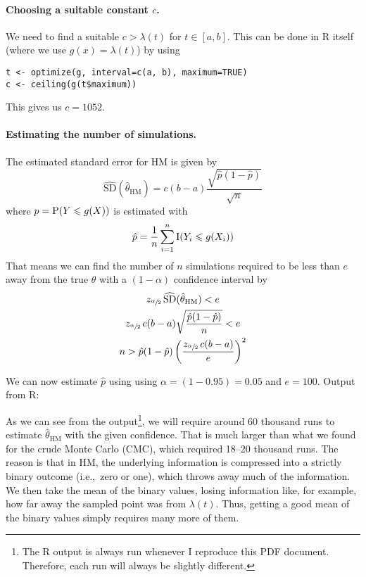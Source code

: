 \documentclass[a4paper,english,12pt]{article}
\begin{document}
\paragraph{Choosing a suitable constant $c$.}
We need to find a suitable $c > \lambda(t)$ for $t \in [a, b]$. This can be
done in R itself (where we use $g(x) = \lambda(t)$) by using
\begin{Verbatim}
t <- optimize(g, interval=c(a, b), maximum=TRUE)
c <- ceiling(g(t$maximum))
\end{Verbatim}
This gives us $c = 1052$.

\paragraph{Estimating the number of simulations.}
The estimated standard error for HM is given by
\[
  \widehat{\textrm{SD}}(\hat{\theta}_{\textrm{HM}})
    = c(b-a) \frac{ \sqrt{\hat{p}(1-\hat{p})}  }{\sqrt{n}}
\]
where $p = \mathrm{P}(Y \leqslant g(X))$ is estimated with
\[
  \hat{p} = \frac{1}{n} \sum_{i=1}^{n} \mathrm{I}( Y_i \leqslant g(X_i) )
\]
That means we can find the number of $n$ simulations required to be less than
$e$ away from the true $\theta$ with a $(1-\alpha)$ confidence interval by
\begin{gather*}
  z_{\sfrac{\alpha}{2}}\, \widehat{\textrm{SD}}(\hat{\theta}_{\textrm{HM}}) < e \\
  z_{\sfrac{\alpha}{2}}\, c(b-a) \sqrt{ \frac{\hat{p}(1-\hat{p})}{n} } < e \\
  n > \hat{p} (1 - \hat{p})
          \left( \frac{ z_{\sfrac{\alpha}{2}}\, c(b - a) }{ e } \right)^2
\end{gather*}

We can now estimate $\hat{p}$ using using $\alpha = (1-0.95) = 0.05$ and $e =
100$. Output from R:

As we can see from the output\footnote{The R output is always run
whenever I reproduce this PDF document. Therefore, each run will always be
slightly different.},
we will require around 60 thousand runs to estimate
$\hat{\theta}_{\textrm{HM}}$ with the given confidence. That is much larger
than what we found for the crude Monte Carlo (CMC), which required 18--20
thousand runs. The reason is that in HM, the underlying information is
compressed into a strictly binary outcome (i.e.,~zero or one), which throws away much of
the information. We then take the mean of the binary values, losing information
like, for example, how far away the sampled point was from $\lambda(t)$. Thus,
getting a good mean of the binary values simply requires many more of them.
\end{document}
